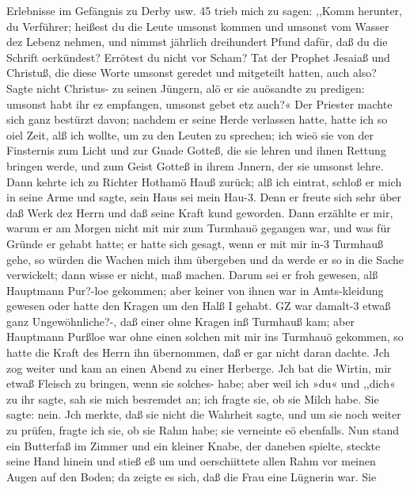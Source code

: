 Erlebnisse im Gefängnis zu Derby usw. 45
trieb mich zu sagen: ,,Komm herunter, du Verführer; heißest du
die Leute umsonst kommen und umsonst vom Wasser dez Lebenz
nehmen, und nimmst jährlich dreihundert Pfund dafür, daß du die
Schrift oerkündest? Errötest du nicht vor Scham? Tat der
Prophet Jesaiaß und Christuß, die diese Worte umsonst geredet
und mitgeteilt hatten, auch also? Sagte nicht Christus- zu seinen
Jüngern, alö er sie auösandte zu predigen: umsonst habt ihr ez
empfangen, umsonst gebet etz auch?« Der Priester machte sich
ganz bestürzt davon; nachdem er seine Herde verlassen hatte,
hatte ich so oiel Zeit, alß ich wollte, um zu den Leuten zu sprechen;
ich wieö sie von der Finsternis zum Licht und zur Gnade Gotteß,
die sie lehren und ihnen Rettung bringen werde, und zum Geist
Gotteß in ihrem Jnnern, der sie umsonst lehre.
Dann kehrte ich zu Richter Hothamö Hauß zurück; alß ich
eintrat, schloß er mich in seine Arme und sagte, sein Haus sei
mein Hau-3. Denn er freute sich sehr über daß Werk dez Herrn
und daß seine Kraft kund geworden. Dann erzählte er mir,
warum er am Morgen nicht mit mir zum Turmhauö gegangen
war, und was für Gründe er gehabt hatte; er hatte sich gesagt,
wenn er mit mir in-3 Turmhauß gehe, so würden die Wachen
mich ihm übergeben und da werde er so in die Sache verwickelt;
dann wisse er nicht, maß machen. Darum sei er froh gewesen,
alß Hauptmann Pur?-loe gekommen; aber keiner von ihnen war
in Amts-kleidung gewesen oder hatte den Kragen um den Halß I
gehabt. GZ war damalt-3 etwaß ganz Ungewöhnliche?-, daß einer
ohne Kragen inß Turmhauß kam; aber Hauptmann Purßloe
war ohne einen solchen mit mir ins Turmhauö gekommen, so hatte
die Kraft des Herrn ihn übernommen, daß er gar nicht daran
dachte.
Jch zog weiter und kam an einen Abend zu einer Herberge.
Jch bat die Wirtin, mir etwaß Fleisch zu bringen, wenn sie solches-
habe; aber weil ich »du« und ,,dich« zu ihr sagte, sah sie mich
besremdet an; ich fragte sie, ob sie Milch habe. Sie sagte: nein.
Jch merkte, daß sie nicht die Wahrheit sagte, und um sie noch
weiter zu prüfen, fragte ich sie, ob sie Rahm habe; sie verneinte eö
ebenfalls. Nun stand ein Butterfaß im Zimmer und ein kleiner
Knabe, der daneben spielte, steckte seine Hand hinein und stieß eß
um und oerschiittete allen Rahm vor meinen Augen auf den
Boden; da zeigte es sich, daß die Frau eine Lügnerin war. Sie


